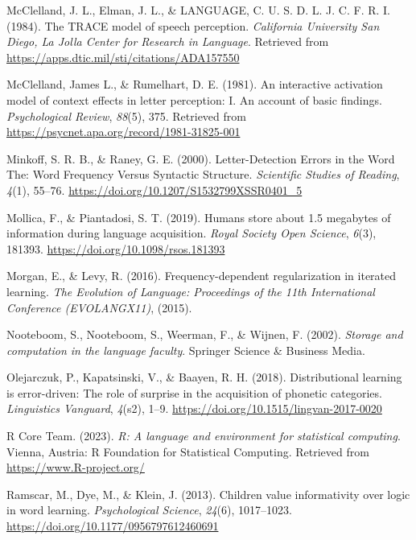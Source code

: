 \documentclass[
  man,floatsintext]{apa6}
\newlength{\cslhangindent}
\newenvironment{CSLReferences}[2] %
 {\begin{list}{}{%
  \setlength{\itemindent}{0pt}
  \setlength{\leftmargin}{0pt}
  \setlength{\parsep}{0pt}
  \ifodd #1
   \setlength{\leftmargin}{\cslhangindent}
   \setlength{\itemindent}{-1\cslhangindent}
  \fi
  \setlength{\itemsep}{#2\baselineskip}}}
 {\end{list}}
\begin{document}
\begin{CSLReferences}{1}{0}
McClelland, J. L., Elman, J. L., \& LANGUAGE, C. U. S. D. L. J. C. F. R. I. (1984). The TRACE model of speech perception. \emph{California University San Diego, La Jolla Center for Research in Language}. Retrieved from \url{https://apps.dtic.mil/sti/citations/ADA157550}

McClelland, James L., \& Rumelhart, D. E. (1981). An interactive activation model of context effects in letter perception: I. An account of basic findings. \emph{Psychological Review}, \emph{88}(5), 375. Retrieved from \url{https://psycnet.apa.org/record/1981-31825-001}

Minkoff, S. R. B., \& Raney, G. E. (2000). Letter-Detection Errors in the Word The: Word Frequency Versus Syntactic Structure. \emph{Scientific Studies of Reading}, \emph{4}(1), 55--76. \url{https://doi.org/10.1207/S1532799XSSR0401_5}

Mollica, F., \& Piantadosi, S. T. (2019). Humans store about 1.5 megabytes of information during language acquisition. \emph{Royal Society Open Science}, \emph{6}(3), 181393. \url{https://doi.org/10.1098/rsos.181393}

Morgan, E., \& Levy, R. (2016). Frequency-dependent regularization in iterated learning. \emph{The Evolution of Language: Proceedings of the 11th International Conference (EVOLANGX11)}, (2015).

Nooteboom, S., Nooteboom, S., Weerman, F., \& Wijnen, F. (2002). \emph{Storage and computation in the language faculty}. Springer Science \& Business Media.

Olejarczuk, P., Kapatsinski, V., \& Baayen, R. H. (2018). Distributional learning is error-driven: The role of surprise in the acquisition of phonetic categories. \emph{Linguistics Vanguard}, \emph{4}(s2), 1--9. \url{https://doi.org/10.1515/lingvan-2017-0020}

R Core Team. (2023). \emph{R: A language and environment for statistical computing}. Vienna, Austria: R Foundation for Statistical Computing. Retrieved from \url{https://www.R-project.org/}

Ramscar, M., Dye, M., \& Klein, J. (2013). Children value informativity over logic in word learning. \emph{Psychological Science}, \emph{24}(6), 1017--1023. \url{https://doi.org/10.1177/0956797612460691}


\end{CSLReferences}
\end{document}
